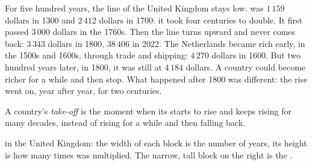 For five hundred years, the line of the United Kingdom stays low.  was $1\,159$ dollars in 1300 and $2\,412$ dollars in 1700: it took four
centuries to double. It first passed $3\,000$ dollars in the 1760s. Then the
line turns upward and never comes back: $3\,343$ dollars in 1800, $38\,406$ in
2022. The Netherlands became rich early, in the 1500s and 1600s, through trade
and shipping: $4\,270$ dollars in 1600. But two hundred years later, in 1800,
it was still at $4\,184$ dollars. A country could become richer for a while
and then stop. What happened after 1800 was different: the rise went on, year
after year, for two centuries.

\begin{definition}\label{def:g6:living-standards:take-off}
A country's \emph{take-off} is the moment when
its  starts to rise and keeps rising for many decades, instead
of rising for a while and then falling back.
\end{definition}

\begin{omfigure}

{\small {} in the United Kingdom: the width of each block is the
number of years, its height is how many times  was multiplied.
The narrow, tall block on the right is the .}
\end{omfigure}

